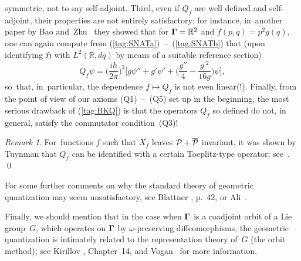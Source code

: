\documentclass[12pt]{amsart}
\numberwithin{equation}{section}
\theoremstyle{remark}
\newtheorem{remark*}{Remark}
\newcommand\Omg{{\bigam}}   %
\newcommand\PP{{\Cal P}}
\newcommand\HH{\mathfrak H}
\newcommand\RR{\mathbb R}
\newcommand{\bigam}{\mbox{\boldmath $\Gamma$}}
\begin{document}
symmetric, not to say self-adjoint. Third, even if $Q_f$ are well defined and
self-adjoint, their properties are not entirely satisfactory: for instance,
in~another paper by Bao and~Zhu~\cite{bib:BaoZ} they showed that for
$\Omg=\RR^2$ and $f(p,q)=p^2 g(q)$, one can again compute from
(\ref{tag:SNATa})~--~(\ref{tag:SNATb}) that (upon identifying $\HH$ with
$L^2(\RR,dq)$ by means of a suitable reference section)
\begin{equation}  Q_f \psi = \Big(\frac{ih}{2\pi}\Big)^2 \Big[g\psi'' + g'\psi'
+ \Big( \frac{g''}4 - \frac{g^{\prime2}}{16g} \Big) \psi \Big] ,
\label{tag:BAOZ}  \end{equation}
so~that, in~particular, the dependence $f\mapsto Q_f$ is not even linear(!).
Finally, from the point of view of our axioms (Q1)~--~(Q5) set up in the
beginning, the most serious drawback of (\ref{tag:BKQ}) is that the operators
$Q_f$ so defined do not, in general, satisfy the commutator condition~(Q3)!

\begin{remark*} For~functions $f$ such that $X_f$ leaves $\PP+\overline\PP$
invariant, it was shown by Tuynman that $Q_f$ can be identified with a certain
Toeplitz-type operator; see~\cite{bib:TuyGBK}.  \qed  \end{remark*}

\medskip

For some further comments on why the standard theory of geometric quantization
may seem unsatisfactory, see Blattner \cite{bib:Blatt}, p.~42, or
Ali~\cite{bib:AliSurv}.

Finally, we should mention that in the case when $\Omg$ is a coadjoint orbit
of a Lie group~$G$, which operates on $\Omg$ by $\omega$-preserving
diffeomorphisms, the geometric quantization is intimately related to the
representation theory of~$G$ (the orbit method); see Kirillov \cite{bib:Kirr},
Chapter~14, and Vogan~ \cite{bib:Vogan} for more information.
\end{document}
